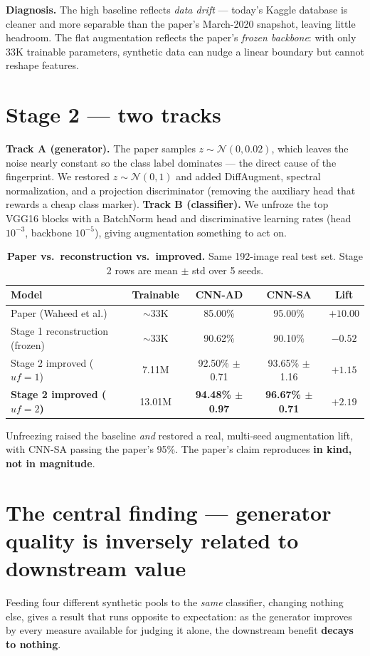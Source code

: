 \documentclass[10pt]{article}
\begin{document}
\noindent\textbf{Diagnosis.} The high baseline reflects \emph{data drift} --- today's Kaggle database is
cleaner and more separable than the paper's March-2020 snapshot, leaving little headroom. The flat
augmentation reflects the paper's \emph{frozen backbone}: with only 33K trainable parameters, synthetic
data can nudge a linear boundary but cannot reshape features.

\section*{Stage 2 --- two tracks}
\textbf{Track A (generator).} The paper samples $z\sim\mathcal{N}(0,0.02)$, which leaves the noise nearly
constant so the class label dominates --- the direct cause of the fingerprint. We restored
$z\sim\mathcal{N}(0,1)$ and added DiffAugment, spectral normalization, and a projection discriminator
(removing the auxiliary head that rewards a cheap class marker).
\textbf{Track B (classifier).} We unfroze the top VGG16 blocks with a BatchNorm head and discriminative
learning rates (head $10^{-3}$, backbone $10^{-5}$), giving augmentation something to act on.

\begin{table}[htbp]\centering
\caption{\textbf{Paper vs.\ reconstruction vs.\ improved.} Same 192-image real test set. Stage 2 rows are
mean $\pm$ std over 5 seeds.}
\begin{tabular}{@{}lcccc@{}}
\toprule
\textbf{Model} & \textbf{Trainable} & \textbf{CNN-AD} & \textbf{CNN-SA} & \textbf{Lift} \\
\midrule
Paper (Waheed et al.) & $\sim$33K & 85.00\% & 95.00\% & $+10.00$ \\
Stage 1 reconstruction (frozen) & $\sim$33K & 90.62\% & 90.10\% & $-0.52$ \\
Stage 2 improved ($uf{=}1$) & 7.11M & 92.50\% $\pm$ 0.71 & 93.65\% $\pm$ 1.16 & $+1.15$ \\
\textbf{Stage 2 improved ($uf{=}2$)} & 13.01M & \textbf{94.48\% $\pm$ 0.97} & \textbf{96.67\% $\pm$ 0.71} & $\mathbf{+2.19}$ \\
\bottomrule
\end{tabular}
\end{table}

\noindent Unfreezing raised the baseline \emph{and} restored a real, multi-seed augmentation lift, with
CNN-SA passing the paper's 95\%. The paper's claim reproduces \textbf{in kind, not in magnitude}.

\section*{The central finding --- generator quality is inversely related to downstream value}
Feeding four different synthetic pools to the \emph{same} classifier, changing nothing else, gives a result
that runs opposite to expectation: as the generator improves by every measure available for judging it
alone, the downstream benefit \textbf{decays to nothing}.
\end{document}
